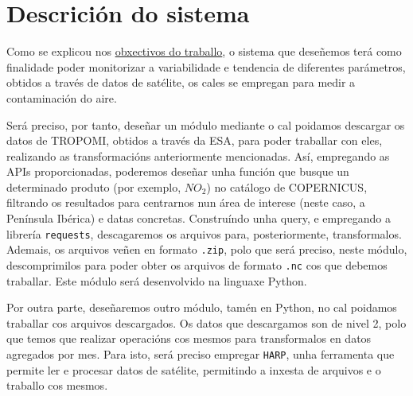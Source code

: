 \section{Descrición do sistema}
Como se explicou nos \hyperref[sec:obxectivos]{obxectivos do traballo}, o sistema que deseñemos terá como finalidade poder monitorizar a variabilidade e tendencia
de diferentes parámetros, obtidos a través de datos de satélite, os cales se empregan para medir a contaminación do aire.

Será preciso, por tanto, deseñar un módulo  mediante o cal poidamos descargar os datos de TROPOMI, obtidos a través da ESA, para poder traballar con eles, realizando
as transformacións anteriormente mencionadas. Así, empregando as APIs proporcionadas, poderemos deseñar unha función que busque un determinado produto (por exemplo,
$NO_{2}$) no catálogo de COPERNICUS, filtrando os resultados para centrarnos nun área de interese (neste caso, a Península Ibérica) e datas concretas. Construíndo unha
query, e empregando a librería \texttt{requests}, descagaremos os arquivos para, posteriormente, transformalos. Ademais, os arquivos veñen en formato \texttt{.zip}, polo que será
preciso, neste módulo, descomprimilos para poder obter os arquivos de formato \texttt{.nc} cos que debemos traballar. Este módulo será desenvolvido na linguaxe Python.

Por outra parte, deseñaremos outro módulo, tamén en Python, no cal poidamos traballar cos arquivos descargados. Os datos que descargamos son de nivel 2, polo que temos que realizar
operacións cos mesmos para transformalos en datos agregados por mes. Para isto, será preciso empregar \texttt{HARP}, unha ferramenta que permite ler e procesar datos de satélite,
permitindo a inxesta de arquivos e o traballo cos mesmos.
